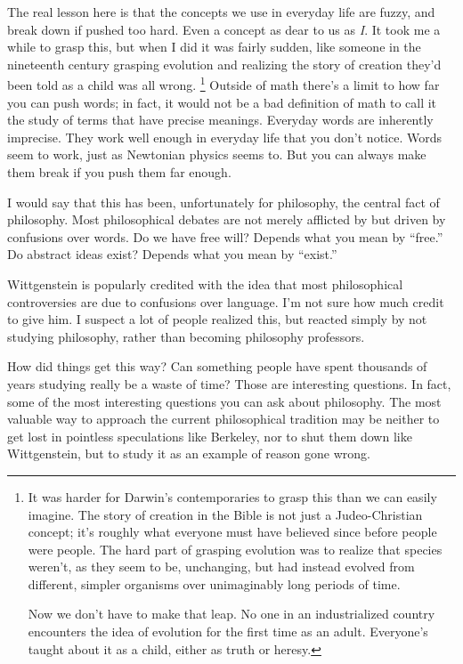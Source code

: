 The real lesson here is that the concepts we use in everyday life are
fuzzy, and break down if pushed too hard. Even a concept as dear to us
as \emph{I}. It took me a while to grasp this, but when I did it was
fairly sudden, like someone in the nineteenth century grasping evolution
and realizing the story of creation they'd been told as a child was all
wrong. \footnote{It was harder for Darwin's contemporaries to grasp this than we
can easily imagine. The story of creation in the Bible is not just a
Judeo-Christian concept; it's roughly what everyone must have believed
since before people were people. The hard part of grasping evolution was
to realize that species weren't, as they seem to be, unchanging, but had
instead evolved from different, simpler organisms over unimaginably long
periods of time.

Now we don't have to make that leap. No one in an industrialized country
encounters the idea of evolution for the first time as an adult.
Everyone's taught about it as a child, either as truth or heresy.} Outside of math there's a limit to how
far you can push words; in fact, it would not be a bad definition of
math to call it the study of terms that have precise meanings. Everyday
words are inherently imprecise. They work well enough in everyday life
that you don't notice. Words seem to work, just as Newtonian physics
seems to. But you can always make them break if you push them far
enough.

I would say that this has been, unfortunately for philosophy, the
central fact of philosophy. Most philosophical debates are not merely
afflicted by but driven by confusions over words. Do we have free will?
Depends what you mean by ``free.'' Do abstract ideas exist? Depends what
you mean by ``exist.''

Wittgenstein is popularly credited with the idea that most philosophical
controversies are due to confusions over language. I'm not sure how much
credit to give him. I suspect a lot of people realized this, but reacted
simply by not studying philosophy, rather than becoming philosophy
professors.

How did things get this way? Can something people have spent thousands
of years studying really be a waste of time? Those are interesting
questions. In fact, some of the most interesting questions you can ask
about philosophy. The most valuable way to approach the current
philosophical tradition may be neither to get lost in pointless
speculations like Berkeley, nor to shut them down like Wittgenstein, but
to study it as an example of reason gone wrong.

